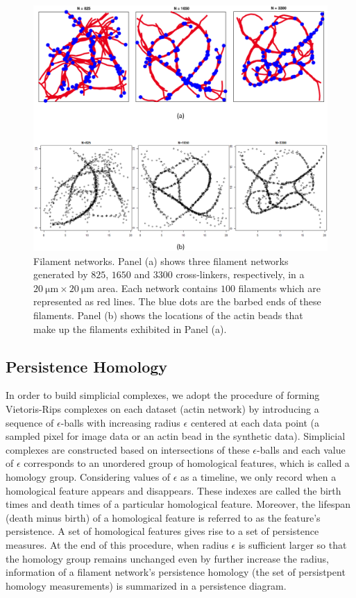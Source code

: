 \documentclass[10pt]{article}
\begin{document}
\begin{figure}[tbp]
	\begin{center}
		\includegraphics[width=1\textwidth]{rawdata.png}
	\end{center}
	\caption{Filament networks. Panel (a) shows three filament networks generated by $825$, $1650$ and $3300$ cross-linkers, respectively, in a $\SI{20}{\micro\metre} \times \SI{20}{\micro\metre}$ area. Each network contains $100$ filaments which are represented as red lines. The blue dots are the barbed ends of these filaments. Panel (b) shows the locations of the actin beads that make up the filaments exhibited in Panel (a).}
	\label{fig:rawdata}
\end{figure}

\subsection{Persistence Homology}
In order to build simplicial complexes, we adopt the procedure of forming Vietoris-Rips complexes on each dataset (actin network) by introducing a sequence of $\epsilon$-balls with increasing radius $\epsilon$ centered at each data point (a sampled pixel for image data or an actin bead in the synthetic data). Simplicial complexes are constructed based on intersections of these $\epsilon$-balls and each value of $\epsilon$ corresponds to an unordered group of homological features, which is called a homology group. Considering values of $\epsilon$ as a timeline, we only record when a homological feature appears and disappears. These indexes are called the birth times and death times of a particular homological feature. Moreover, the lifespan (death minus birth) of a homological feature is referred to as the feature's persistence. A set of homological features gives rise to a set of persistence measures. At the end of this procedure, when radius $\epsilon$ is sufficient larger so that the homology group remains unchanged even by further increase the radius, information of a filament network's persistence homology (the set of persistpent homology measurements) is summarized in a persistence diagram.
\end{document}
